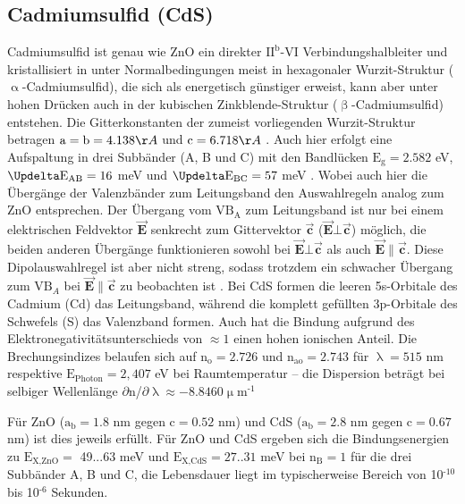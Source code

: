 \subsection{Cadmiumsulfid (CdS)}
Cadmiumsulfid ist genau wie ZnO ein direkter $\text{II}^\text{b}$-VI Verbindungshalbleiter und kristallisiert in unter Normalbedingungen meist in hexagonaler Wurzit-Struktur ($\upalpha$-Cadmiumsulfid), die sich als energetisch günstiger erweist, kann aber unter hohen Drücken auch in der kubischen Zinkblende-Struktur ($\upbeta$-Cadmiumsulfid) entstehen. Die Gitterkonstanten der zumeist vorliegenden Wurzit-Struktur betragen $\text{a} = \text{b} = 4.138 \AA$ und $\text{c} = 6.718 \AA$ \cite{Hotje.2003}. Auch hier erfolgt eine Aufspaltung in drei Subbänder (A, B und C) mit den Bandlücken $\text{E}_\text{g}= 2.582$ eV, $\Updelta\text{E}_\text{AB}= 16$ meV und $\Updelta \text{E}_\text{BC}= 57$ meV \cite{Thomas.1962}. Wobei auch hier die Übergänge der Valenzbänder zum Leitungsband den Auswahlregeln analog zum ZnO entsprechen. Der Übergang vom $\text{VB}_\text{A}$ zum Leitungsband ist nur bei einem elektrischen Feldvektor $\vec{\textbf{E}}$ senkrecht zum Gittervektor $\vec{\textbf{c}}$  ($\vec{\textbf{E}} \bot \vec{\textbf{c}}$) möglich, die beiden anderen Übergänge funktionieren sowohl bei $\vec{\textbf{E}} \bot \vec{\textbf{c}}$ als auch $\vec{\textbf{E}} \| \vec{\textbf{c}}$. Diese Dipolauswahlregel ist aber nicht streng, sodass trotzdem ein schwacher Übergang zum $\text{VB}_A$ bei  $\vec{\textbf{E}} \| \vec{\textbf{c}}$ zu beobachten ist \cite{Thomas.1962}. Bei CdS formen die leeren 5s-Orbitale des Cadmium (Cd) das Leitungsband, während die komplett gefüllten 3p-Orbitale des Schwefels (S) das Valenzband formen. Auch hat die Bindung aufgrund des Elektronegativitätsunterschieds von $\approx 1$ einen hohen ionischen Anteil. Die Brechungsindizes belaufen sich auf $\text{n}_\text{o}= 2.726$ und $\text{n}_\text{ao}= 2.743$ für $\uplambda= 515$ nm respektive $\text{E}_\text{Photon}= 2,407$ eV bei Raumtemperatur – die Dispersion beträgt bei selbiger Wellenlänge $\partial$n/$\partial \uplambda\approx -8.8460 \upmu \text{m}^\text{-1}$ \cite{Bieniewski.1963}

Für ZnO ($\text{a}_\text{b}= 1.8$ nm \cite{Haranath.2009} gegen $\text{c}= 0.52$ nm) und CdS ($\text{a}_\text{b}= 2.8$ nm \cite{Titova.2006} gegen $\text{c} = 0.67$ nm) ist dies jeweils erfüllt.
Für ZnO und CdS ergeben sich die Bindungsenergien zu $\text{E}_\text{X,ZnO}=$ 49...63 meV \cite{Mang.1995} und $\text{E}_\text{X,CdS}= 27..31$ meV \cite{Imada.2002} bei $\text{n}_\text{B}= 1$ für die drei Subbänder A, B und C, die Lebensdauer liegt im typischerweise Bereich von 10$^\text{-10}$ bis 10$^\text{-6}$ Sekunden.
